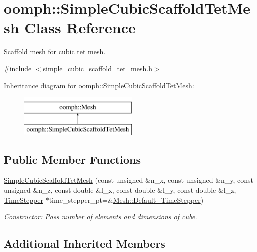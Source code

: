 \hypertarget{classoomph_1_1SimpleCubicScaffoldTetMesh}{}\section{oomph\+:\+:Simple\+Cubic\+Scaffold\+Tet\+Mesh Class Reference}
\label{classoomph_1_1SimpleCubicScaffoldTetMesh}


Scaffold mesh for cubic tet mesh.  




{\ttfamily \#include $<$simple\+\_\+cubic\+\_\+scaffold\+\_\+tet\+\_\+mesh.\+h$>$}

Inheritance diagram for oomph\+:\+:Simple\+Cubic\+Scaffold\+Tet\+Mesh\+:\begin{figure}[H]
\begin{center}
\leavevmode
\includegraphics[height=2.000000cm]{classoomph_1_1SimpleCubicScaffoldTetMesh}
\end{center}
\end{figure}
\subsection*{Public Member Functions}
\begin{DoxyCompactItemize}
\item 
\hyperlink{classoomph_1_1SimpleCubicScaffoldTetMesh_ae5e28728db973c9c33ca787658028fd3}{Simple\+Cubic\+Scaffold\+Tet\+Mesh} (const unsigned \&n\+\_\+x, const unsigned \&n\+\_\+y, const unsigned \&n\+\_\+z, const double \&l\+\_\+x, const double \&l\+\_\+y, const double \&l\+\_\+z, \hyperlink{classoomph_1_1TimeStepper}{Time\+Stepper} $\ast$time\+\_\+stepper\+\_\+pt=\&\hyperlink{classoomph_1_1Mesh_a12243d0fee2b1fcee729ee5a4777ea10}{Mesh\+::\+Default\+\_\+\+Time\+Stepper})
\begin{DoxyCompactList}\small\item\em Constructor\+: Pass number of elements and dimensions of cube. \end{DoxyCompactList}\end{DoxyCompactItemize}
\subsection*{Additional Inherited Members}


